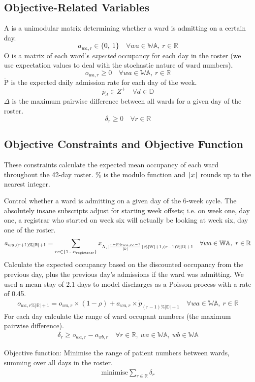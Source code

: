 \documentclass[a4paper]{article}
\DeclarePairedDelimiter{\ceil}{\lceil}{\rceil}
\begin{document}
\subsection{Objective-Related Variables}

A is a unimodular matrix determining whether a ward is admitting on a certain day.
$$a_{wa, r} \in \{0,\ 1\} \quad\forall wa\in \mathbb{WA},\ r\in \mathbb{R}$$
O is a matrix of each ward's \emph{expected} occupancy for each day in the roster (we use expectation values to deal with the stochastic nature of ward numbers).
$$o_{wa, r} \ge 0 \quad\forall wa\in \mathbb{WA},\ r\in \mathbb{R}$$
$\dot{\text{P}}$ is the expected daily admission rate for each day of the week.
$$\dot{p_{d}} \in Z^+ \quad\forall d\in \mathbb{D}$$
$\Delta$ is the maximum pairwise difference between all wards for a given day of the roster.
$$\delta_r \ge 0 \quad\forall r \in \mathbb{R}$$

\subsection{Objective Constraints and Objective Function}

These constraints calculate the expected mean occupancy of each ward throughout the 42-day roster. $\%$ is the modulo function and $\ceil{x}$ rounds up to the nearest integer.

Control whether a ward is admitting on a given day of the 6-week cycle. The absolutely insane subscripts adjust for starting week offsets; i.e. on week one, day one, a registrar who started on week six will actually be looking at week six, day one of the roster.
\begin{align}
  a_{wa, (r+1)\%|\mathbb{R}|+1} = \sum_{re\in \{1\dots n_\text{registrars}\}}{x_{\text{A}, \ceil{\frac{r+|\mathbb{D}|\text{s}_{wa, re}-1}{|\mathbb{D}|}} \% |\mathbb{W}|+1, (r-1) \% |\mathbb{D}|+1}} \quad\forall wa \in \mathbb{WA},\ r \in \mathbb{R}
\end{align}
Calculate the expected occupancy based on the discounted occupancy from the previous day, plus the previous day's admissions if the ward was admitting. We used a mean stay of 2.1 days to model discharges as a Poisson process with a rate of 0.45.
\begin{align}
  o_{wa, r\%|\mathbb{R}|+1} = o_{wa, r} \times (1-\rho) + a_{wa, r} \times \dot{p}_{(r-1)\%|\mathbb{D}|+1} \quad\forall wa \in \mathbb{WA},\ r \in \mathbb{R}
\end{align}
For each day calculate the range of ward occupant numbers (the maximum pairwise difference).
\begin{align}
  \delta_r \ge o_{wa, r} - o_{wb, r} \quad\forall r \in \mathbb{R},\ wa \in \mathbb{WA},\ wb \in \mathbb{WA}
\end{align}

\begin{framed}
Objective function: Minimise the range of patient numbers between wards, summing over all days in the roster.
\begin{align}
  \text{minimise} \sum_{r\in \mathbb{R}}{\delta_r}
\end{align}
\end{framed}
\end{document}
